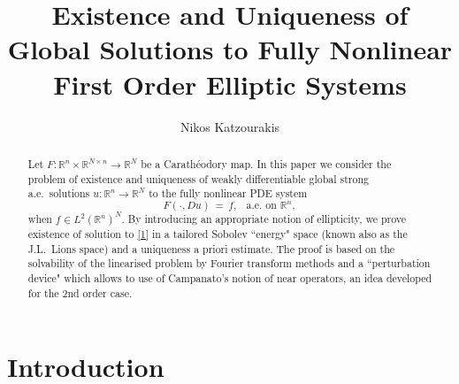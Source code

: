 \documentclass{amsart}
\theoremstyle{definition}
\numberwithin{equation}{section}
\begin{document}
\title[Existence and Uniqueness for Fully Nonlinear Systems]{Existence and Uniqueness of Global Solutions to Fully Nonlinear First Order Elliptic Systems}

\author{Nikos Katzourakis}
\address{Department of Mathematics and Statistics, University of Reading, Whiteknights, PO Box 220, Reading RG6 6AX, Berkshire, UK}


\date{}


\begin{abstract} Let $F : \mathbb{R}^n \times \mathbb{R}^{N\times n} \rightarrow \mathbb{R}^N$ be a Carath\'eodory map. In this paper we consider the problem of existence and uniqueness of weakly differentiable global strong a.e.\ solutions $u: \mathbb{R}^n \longrightarrow \mathbb{R}^N$ to the fully nonlinear PDE system
\[\label{1} \tag{1}
F(\cdot,Du ) \,=\,  f, \ \ \text{ a.e.\ on }{\mathbb{R}}^n,
\]
when $ f\in L^2({\mathbb{R}}^n)^N$. By introducing an appropriate notion of ellipticity, we prove existence of solution to \eqref{1} in a tailored Sobolev ``energy" space (known also as the J.L.\ Lions space) and a uniqueness a priori estimate. The proof is based on the solvability of the linearised problem by Fourier transform methods and a ``perturbation device" which allows to use of Campanato's notion of near operators, an idea developed for the 2nd order case.
\end{abstract} 

\maketitle

\section{Introduction} \label{section1}
\end{document}
